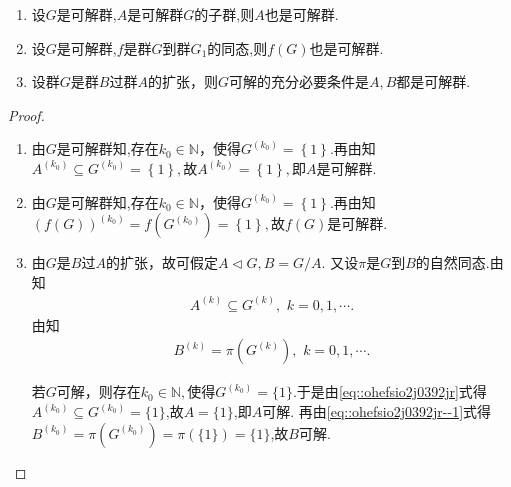 \documentclass[../../main.tex]{subfiles}%
\begin{document}
\begin{theorem}\label{theorem:可解群过可解群的扩张必是可解群}

\begin{enumerate}[(1)]
\item\label{theorem:可解群过可解群的扩张必是可解群-1} 设$G$是可解群,$A$是可解群$G$的子群,则$A$也是可解群.

\item\label{theorem:可解群过可解群的扩张必是可解群-2} 设$G$是可解群,$f$是群$G$到群$G_1$的同态,则$f(G)$也是可解群.

\item\label{theorem:可解群过可解群的扩张必是可解群-3} 设群$G$是群$B$过群$A$的扩张，则$G$可解的充分必要条件是$A, B$都是可解群.
\end{enumerate}
\end{theorem}
\begin{proof}
\begin{enumerate}[(1)]
\item 由$G$是可解群知,存在$k_0\in \mathbb{N}$，使得$G^{\left( k_0 \right)}=\left\{ 1 \right\}.$再由知$A^{\left( k_0 \right)}\subseteq G^{\left( k_0 \right)}=\left\{ 1 \right\},$故$A^{\left( k_0 \right)}=\left\{ 1 \right\},$即$A$是可解群.

\item 由$G$是可解群知,存在$k_0\in \mathbb{N}$，使得$G^{\left( k_0 \right)}=\left\{ 1 \right\}.$再由知$\left( f\left( G \right) \right) ^{\left( k_0 \right)}=f\left( G^{\left( k_0 \right)} \right) =\left\{ 1 \right\},$故$f\left( G \right)$是可解群.

\item 由$G$是$B$过$A$的扩张，故可假定$A \lhd G, B = G/A$. 又设$\pi$是$G$到$B$的自然同态.由知
\begin{align}\label{eq::ohefsio2j0392jr}
A^{(k)} \subseteq G^{(k)},\,\,k=0,1,\cdots.
\end{align}
由知
\begin{align}\label{eq::ohefsio2j0392jr--1}
B^{(k)}=\pi(G^{(k)}),\,\, k =0,1,\cdots.
\end{align}

若$G$可解，则存在$k_0\in \mathbb{N},$使得$G^{(k_0)}=\{1\}$.于是由\eqref{eq::ohefsio2j0392jr}式得$A^{(k_0)} \subseteq G^{(k_0)}=\{1\}$,故$A=\{1\}$,即$A$可解.
再由\eqref{eq::ohefsio2j0392jr--1}式得$B^{(k_0)}=\pi(G^{(k_0)})=\pi(\{1\})=\{1\}$,故$B$可解.


\end{enumerate}
\end{proof}
\end{document}
